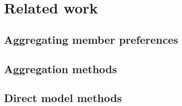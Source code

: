 \chapter{Related work}

\section{Aggregating member preferences}

\section{Aggregation methods}

\section{Direct model methods}